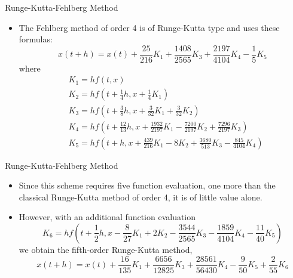 \documentclass{beamer}
\newcommand{\beforeverb}{\scriptsize}
\newcommand{\afterverb}{\normalsize}
\begin{document}
\begin{frame}{Runge-Kutta-Fehlberg Method}
\begin{itemize}
\item The Fehlberg method of order 4 is of Runge-Kutta type and uses these formulas:
\[
x(t+h)=x(t)+\frac{25}{216} K_1+\frac{1408}{2565} K_3+\frac{2197}{4104}K_4-\frac{1}{5}K_5
\]
where
\beforeverb
\begin{align*}
&K_1=hf(t,x)\\  
&K_2=hf\left(t+\frac{1}{4}h,x+\frac{1}{4} K_1\right)\\
&K_3=hf\left(t+\frac{3}{8}h,x+\frac{3}{32} K_1+\frac{3}{32} K_2\right)   \\
&K_4=hf\left(t+\frac{12}{13}h,x+\frac{1932}{2197} K_1-\frac{7200}{2197} K_2 + \frac{7296}{2197}K_3\right)   \\
&K_5=hf\left(t+h,x+\frac{439}{216} K_1-8 K_2 + \frac{3680}{513}K_3-\frac{845}{4104}K_4\right)  
\end{align*}
\end{itemize}
\end{frame}
\begin{frame}{Runge-Kutta-Fehlberg Method}
\begin{itemize}
\item Since this scheme requires \alert{five} function evaluation, one more than the classical Runge-Kutta method of order 4, it is of little value alone. 
\item However, with an additional function evaluation
\beforeverb
\[
K_6=hf\left(t+\frac{1}{2}h,x-\frac{8}{27} K_1+2 K_2 - \frac{3544}{2565}K_3-\frac{1859}{4104}K_4-\frac{11}{40}K_5\right)  
\]
\afterverb
we obtain the \alert{fifth-order Runge-Kutta method},
\[
x(t+h)=x(t)+\frac{16}{135} K_1+\frac{6656}{12825} K_3+\frac{28561}{56430}K_4-\frac{9}{50}K_5+\frac{2}{55} K_6
\]
\end{itemize}
\end{frame}
\end{document}
